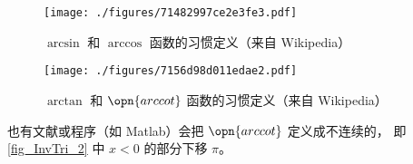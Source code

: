 
\begin{issues}
\issueDraft
\end{issues}

\begin{figure}[ht]
\centering
\texttt{[image: ./figures/71482997ce2e3fe3.pdf]}
\caption{$\arcsin$ 和 $\arccos$ 函数的习惯定义（来自 Wikipedia）} \label{fig_InvTri_1}
\end{figure}

\begin{figure}[ht]
\centering
\texttt{[image: ./figures/7156d98d011edae2.pdf]}
\caption{$\arctan$ 和 $\opn{arccot}$ 函数的习惯定义（来自 Wikipedia）} \label{fig_InvTri_2}
\end{figure}

也有文献或程序（如 Matlab）会把 $\opn{arccot}$ 定义成不连续的， 即\autoref{fig_InvTri_2} 中 $x<0$ 的部分下移 $\pi$。

